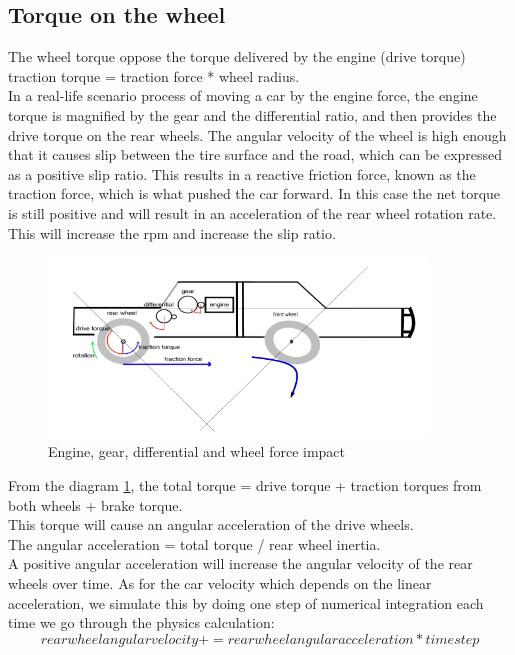 \documentclass{book}
\begin{document}
\subsection{Torque on the wheel} The wheel torque oppose the torque delivered by the engine (drive torque)\\
 traction torque = traction force  *  wheel radius.\\
 In a real-life scenario process of moving a car by the engine force, the engine torque is magnified by the gear and the differential ratio, and then provides the drive torque on the rear wheels.  The angular velocity of the wheel is high enough that it causes slip between the tire surface and the road, which can be expressed as a positive slip ratio. This results in a reactive friction force, known as the traction force, which is what pushed the car forward.  In this case the net torque is still positive and will result in an acceleration of the rear wheel rotation rate. This will increase the rpm and increase the slip ratio.

 \begin{figure}[htbp]
  \centering
  \includegraphics[width=0.9\textwidth]{enginegearwheelforce}
  \caption{Engine, gear, differential and wheel force impact}
  \label{fig:enginegearwheelforce}
\end{figure}



 From the diagram \ref{fig:enginegearwheelforce}, the total torque = drive torque + traction torques from both wheels + brake torque.\\ This torque will cause an angular acceleration of the drive wheels.\\
 The angular acceleration = total torque / rear wheel inertia.\\
 A positive angular acceleration will increase the angular velocity of the rear wheels over time. As for the car velocity which depends on the linear acceleration, we simulate this by doing one step of numerical integration each time we go through the physics calculation:
\begin{equation}
rear wheel angular velocity += rear wheel angular acceleration * time step
\end{equation}
\end{document}
